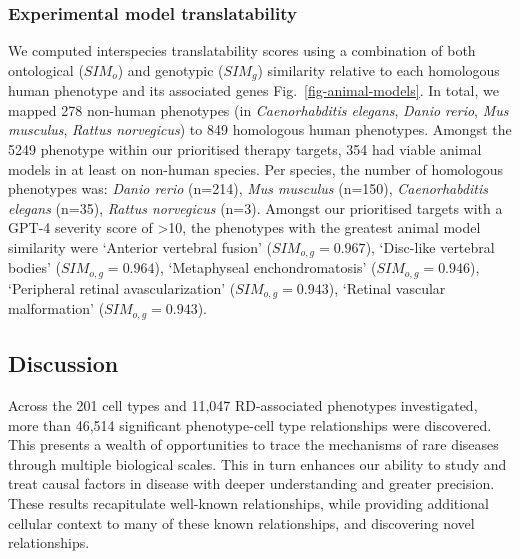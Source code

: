 \documentclass[
]{agujournal2019}
\begin{document}
\subsubsection{Experimental model
translatability}\label{experimental-model-translatability}

We computed interspecies translatability scores using a combination of
both ontological (\(SIM_{o}\)) and genotypic (\(SIM_{g}\)) similarity
relative to each homologous human phenotype and its associated genes
Fig.~\ref{fig-animal-models}. In total, we mapped 278 non-human
phenotypes (in \emph{Caenorhabditis elegans}, \emph{Danio rerio},
\emph{Mus musculus}, \emph{Rattus norvegicus}) to 849 homologous human
phenotypes. Amongst the 5249 phenotype within our prioritised therapy
targets, 354 had viable animal models in at least on non-human species.
Per species, the number of homologous phenotypes was: \emph{Danio rerio}
(n=214), \emph{Mus musculus} (n=150), \emph{Caenorhabditis elegans}
(n=35), \emph{Rattus norvegicus} (n=3). Amongst our prioritised targets
with a GPT-4 severity score of \textgreater10, the phenotypes with the
greatest animal model similarity were `Anterior vertebral fusion'
(\(SIM_{o,g}=0.967\)), `Disc-like vertebral bodies'
(\(SIM_{o,g}=0.964\)), `Metaphyseal enchondromatosis'
(\(SIM_{o,g}=0.946\)), `Peripheral retinal avascularization'
(\(SIM_{o,g}=0.943\)), `Retinal vascular malformation'
(\(SIM_{o,g}=0.943\)).

\subsection{Discussion}\label{sec-discussion}

Across the 201 cell types and 11,047 RD-associated phenotypes
investigated, more than 46,514 significant phenotype-cell type
relationships were discovered. This presents a wealth of opportunities
to trace the mechanisms of rare diseases through multiple biological
scales. This in turn enhances our ability to study and treat causal
factors in disease with deeper understanding and greater precision.
These results recapitulate well-known relationships, while providing
additional cellular context to many of these known relationships, and
discovering novel relationships.
\end{document}
